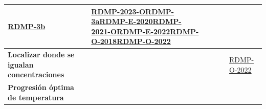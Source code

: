 \begin{table}[H]
{\begin{tabular}{|p{4.5cm}|p{2.5cm}|p{2cm}|p{2.5cm}|p{2.5cm}|p{3.5cm}|}
            \hyperlink{qs:RDMP-3b}{RDMP-3b}                                                                                                                                                                 &
            \hyperlink{qs:RDMP-2023-O}{RDMP-2023-O}\newline \hyperlink{qs:RDMP-3a}{RDMP-3a}\newline \hyperlink{qs:RDMP-E-2020}{RDMP-E-2020}\newline \hyperlink{qs:RDMP-2021-O}{RDMP-2021-O}\newline \hyperlink{qs:RDMP-E-2022}{RDMP-E-2022}\newline \hyperlink{qs:RDMP-O-2018}{RDMP-O-2018}\newline \hyperlink{qs:RDMP-O-2022}{RDMP-O-2022}                                                                       \\
            \hline
            \textbf{Localizar donde se igualan concentraciones}                                                                                                                                             &
                                                                                                                                                                                                            &
                                                                                                                                                                                                            &
                                                                                                                                                                                                            &
                                                                                                                                                                                                            &
            \hyperlink{qs:RDMP-O-2022}{RDMP-O-2022}                                                                                                                                                                                                                                                                                                               \\
            \hline
            \textbf{Progresión óptima de temperatura}                                                                                                                                                       &
                                                                                                                                                                                                            &

\end{tabular}}
\end{table}
